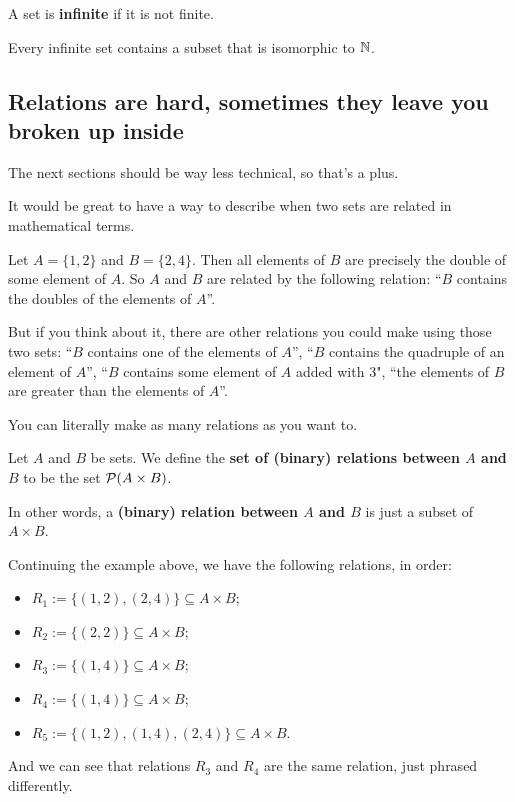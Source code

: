 \begin{df}
	A set is \textbf{infinite} if it is not finite.
\end{df}

\begin{cor}
	Every infinite set contains a subset that is isomorphic to $\mathbb N$.
\end{cor}

\newpage
\subsection{Relations are hard, sometimes they leave you broken up inside}

The next sections should be way less technical, so that's a plus.

It would be great to have a way to describe when two sets are related in mathematical terms.

\begin{ex}
	Let $A=\{1,2\}$ and $B=\{2,4\}$. Then all elements of $B$ are precisely the double of some element of $A$. So $A$ and $B$ are related by the following relation: ``$B$ contains the doubles of the elements of $A$''.
	
	But if you think about it, there are other relations you could make using those two sets: ``$B$ contains one of the elements of $A$'', ``$B$ contains the quadruple of an element of $A$'', ``$B$ contains some element of $A$ added with 3", ``the elements of $B$ are greater than the elements of $A$''.
	
	You can literally make as many relations as you want to.
\end{ex}

\begin{df}
	Let $A$ and $B$ be sets. We define the \textbf{set of (binary) relations between $A$ and $B$} to be the set $\mathcal P(A\times B)$.
	
	In other words, a \textbf{(binary) relation between $A$ and $B$} is just a subset of $A\times B$.
\end{df}

\begin{ex}
	Continuing the example above, we have the following relations, in order:
	\begin{itemize}
		\item $R_1:=\{(1,2),(2,4)\}\subseteq A\times B$;
		\item $R_2:=\{(2,2)\}\subseteq A\times B$;
		\item $R_3:=\{(1,4)\}\subseteq A\times B$;
		\item $R_4:=\{(1,4)\}\subseteq A\times B$;
		\item $R_5:=\{(1,2),(1,4),(2,4)\}\subseteq A\times B$.
	\end{itemize}

And we can see that relations $R_3$ and $R_4$ are the same relation, just phrased differently.
\end{ex}

